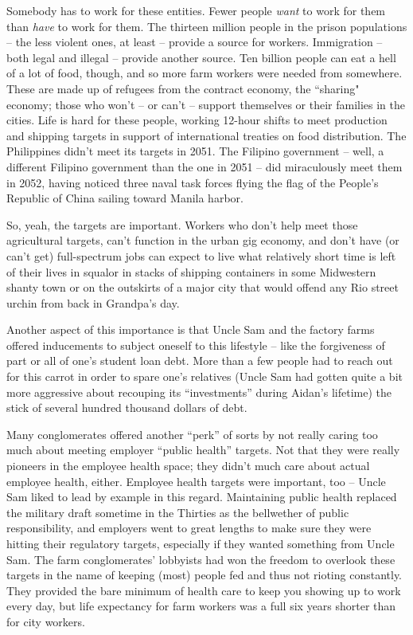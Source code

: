 \documentclass[11pt]{book}
\begin{document}
	Somebody has to work for these entities. Fewer people \textit{want} to work for them than \textit{have} to work for them. The thirteen million people in the prison populations -- the less violent ones, at least -- provide a source for workers. Immigration -- both legal and illegal -- provide another source. Ten billion people can eat a hell of a lot of food, though, and so more farm workers were needed from somewhere. These are made up of refugees from the contract economy, the ``sharing" economy; those who won't -- or can't -- support themselves or their families in the cities. Life is hard for these people, working 12-hour shifts to meet production and shipping targets in support of international treaties on food distribution. The Philippines didn't meet its targets in 2051. The Filipino government -- well, a different Filipino government than the one in 2051 -- did miraculously meet them in 2052, having noticed three naval task forces flying the flag of the People's Republic of China sailing toward Manila harbor.
	
	So, yeah, the targets are important. Workers who don't help meet those agricultural targets, can't function in the urban gig economy, and don't have (or can't get) full-spectrum jobs can expect to live what relatively short time is left of their lives in squalor in stacks of shipping containers in some Midwestern shanty town or on the outskirts of a major city that would offend any Rio street urchin from back in Grandpa's day.
	
	Another aspect of this importance is that Uncle Sam and the factory farms offered inducements to subject oneself to this lifestyle -- like the forgiveness of part or all of one's student loan debt. More than a few people had to reach out for this carrot in order to spare one's relatives (Uncle Sam had gotten quite a bit more aggressive about recouping its ``investments'' during Aidan's lifetime) the stick of several hundred thousand dollars of debt. 
	
	Many conglomerates offered another ``perk'' of sorts by not really caring too much about meeting employer ``public health'' targets. Not that they were really pioneers in the employee health space; they didn't much care about actual employee health, either. Employee health targets were important, too -- Uncle Sam liked to lead by example in this regard. Maintaining public health replaced the military draft sometime in the Thirties as the bellwether of public responsibility, and employers went to great lengths to make sure they were hitting their regulatory targets, especially if they wanted something from Uncle Sam. The farm conglomerates' lobbyists had won the freedom to overlook these targets in the name of keeping (most) people fed and thus not rioting constantly. They provided the bare minimum of health care to keep you showing up to work every day, but life expectancy for farm workers was a full six years shorter than for city workers. 
	
\end{document}
